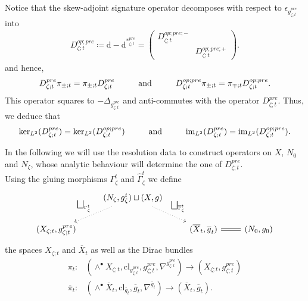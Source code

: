 \documentclass[psamsfonts]{amsart}
\theoremstyle{plain}
\theoremstyle{definition}{
\newtheorem{defi}{Definition}[section]
\newtheorem{ass}{Assumption}
\newtheorem*{nota}{Notation}}
\theoremstyle{remark}{
\newtheorem{rem}{Remark}
\newtheorem{ex}{Example}}
\theoremstyle{plain}{
\newtheorem{thm}{Theorem}[section]
\newtheorem{lem}{Lemma}[section]
\newtheorem{cor}{Corollary}[section]
\newtheorem{prop}{Proposition}[section]
\newtheorem{con}{Conjecture}[section]}
\newcommand{\m}[1]{{\mathrm{#1}}}
\newcommand{\und}[1]{\hspace{#1}\text{and}\hspace{#1}}
\begin{document}
Notice that the skew-adjoint  signature operator decomposes with respect to $\epsilon_{g^{pre}_{\zeta;t}}$ into
\begin{align*}
    D_{\zeta;t}^{op;pre}\coloneqq \m{d}-\m{d}^{*_{\zeta;t}^{pre}}=\left(\begin{array}{cc}
         D^{op;pre;-}_{\zeta;t}&\\
         & D^{op;pre;+}_{\zeta;t}
    \end{array}\right).
\end{align*}
and hence,
\begin{align*}
    D_{\zeta;t}^{pre}\pi_{\pm;t}=\pi_{\pm;t}D_{\zeta;t}^{pre}\und{1.0cm}D_{\zeta;t}^{op;pre}\pi_{\pm;t}=\pi_{\mp;t}D_{\zeta;t}^{op;pre}.
\end{align*}
This operator squares to $-\Delta_{g^{pre}_{\zeta;t}}$ and anti-commutes with the operator $D_{\zeta;t}^{pre}$. Thus, we deduce that 
\begin{align*}
    \m{ker}_{L^2}(D_{\zeta;t}^{pre})=\m{ker}_{L^2}(D_{\zeta;t}^{op;pre})\und{1.0cm}\m{im}_{L^2}(D_{\zeta;t}^{pre})=\m{im}_{L^2}(D_{\zeta;t}^{op;pre}).
\end{align*}

In the following we will use the resolution data to construct operators on $X$, $N_0$ and $N_\zeta$, whose analytic behaviour will determine the one of $D^{pre}_{\zeta;t}$.\\

Using the gluing morphisms $\Gamma^t_\zeta$ and $\hat{\Gamma}^t_\zeta$ we define 
\begin{equation*}
    \begin{tikzcd}
        &(N_\zeta,g^t_\zeta)\sqcup (X,g)\arrow[dl,"\bigsqcup_{ \Gamma^t_\zeta}",swap,dotted]\arrow[dr,"\bigsqcup_{\overline{\Gamma}^t_\zeta}",dotted]&&\\
        (X_{\zeta;t},g^{pre}_{\zeta;t})&&(\overline{X}_t,\overline{g}_t)\arrow[r,equal]&(N_0,g_0)        
    \end{tikzcd}
\end{equation*}
the spaces $X_{\zeta;t}$ and $\overline{X}_t$ as well as the Dirac bundles
\begin{align*}
    \pi_t\colon &(\wedge^\bullet X_{\zeta;t},\m{cl}_{g^{pre}_{\zeta;t}},g^{pre}_{\zeta;t},\nabla^{g^{pre}_{\zeta;t}})\rightarrow (X_{\zeta;t},g^{pre}_{\zeta;t})\\\overline{\pi}_t\colon &(\wedge^\bullet\overline{X}_t,\m{cl}_{\overline{g}_t},\overline{g}_t,\nabla^{\overline{g}_t})\rightarrow (\overline{X}_t,\overline{g}_t).
\end{align*}
\end{document}
